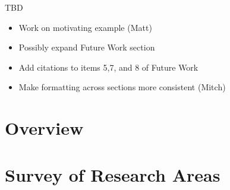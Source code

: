 \documentclass[runningheads,a4paper]{llncs}
\begin{document}
TBD
\begin{itemize}
\item Work on motivating example (Matt)
\item Possibly expand Future Work section
\item Add citations to items 5,7, and 8 of Future Work
\item Make formatting across sections more consistent (Mitch)
\end{itemize}


\section{Overview}


\section{Survey of Research Areas}








\end{document}
